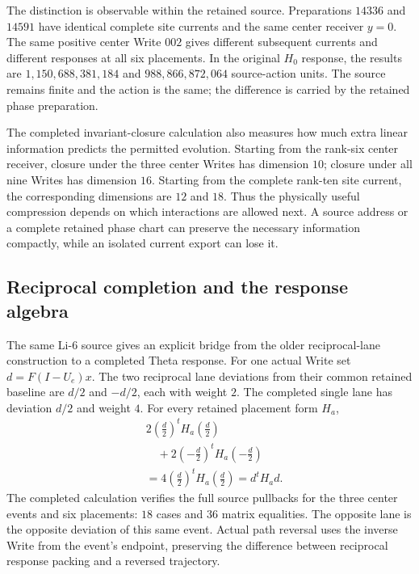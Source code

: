 The distinction is observable within the retained source. Preparations $14336$ and $14591$ have identical complete site currents and the same center receiver $y=0$. The same positive center Write $002$ gives different subsequent currents and different responses at all six placements. In the original $H_0$ response, the results are $1{,}150{,}688{,}381{,}184$ and $988{,}866{,}872{,}064$ source-action units. The source remains finite and the action is the same; the difference is carried by the retained phase preparation.

The completed invariant-closure calculation also measures how much extra linear information predicts the permitted evolution. Starting from the rank-six center receiver, closure under the three center Writes has dimension $10$; closure under all nine Writes has dimension $16$. Starting from the complete rank-ten site current, the corresponding dimensions are $12$ and $18$. Thus the physically useful compression depends on which interactions are allowed next. A source address or a complete retained phase chart can preserve the necessary information compactly, while an isolated current export can lose it.

\subsection{Reciprocal completion and the response algebra}

The same Li-6 source gives an explicit bridge from the older reciprocal-lane construction to a completed Theta response. For one actual Write set $d=F(I-U_e)x$. The two reciprocal lane deviations from their common retained baseline are $d/2$ and $-d/2$, each with weight $2$. The completed single lane has deviation $d/2$ and weight $4$. For every retained placement form $H_a$,
\begin{equation}
\begin{aligned}
 &2\left(\frac d2\right)^tH_a\left(\frac d2\right)\\
 &\quad+2\left(-\frac d2\right)^tH_a\left(-\frac d2\right)\\
 &=4\left(\frac d2\right)^tH_a\left(\frac d2\right)
 =d^tH_a d.
\end{aligned}
\end{equation}
The completed calculation verifies the full source pullbacks for the three center events and six placements: $18$ cases and $36$ matrix equalities. The opposite lane is the opposite deviation of this same event. Actual path reversal uses the inverse Write from the event's endpoint, preserving the difference between reciprocal response packing and a reversed trajectory.

